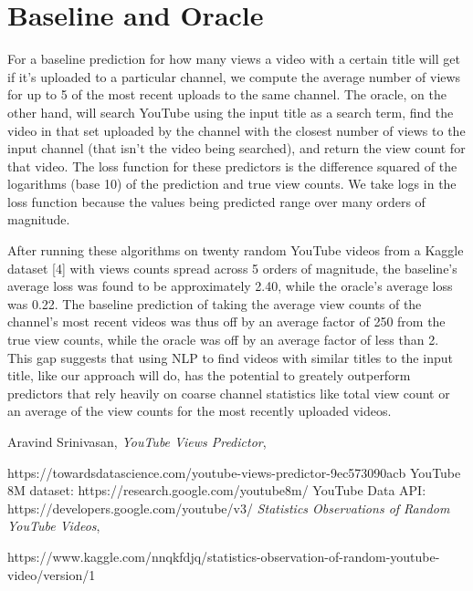 \documentclass[12pt]{article}
\theoremstyle{definition}
\theoremstyle{remark}
\begin{document}
\section{Baseline and Oracle}
For a baseline prediction for how many views a video with a certain title will
get if it's uploaded to a particular channel, we compute the average number of
views for up to 5 of the most recent uploads to the same channel. The oracle, on
the other hand, will search YouTube using the input title as a search term, find
the video in that set uploaded by the channel with the closest number of views
to the input channel (that isn't the video being searched), and return the view
count for that video. The loss function for these predictors is the difference squared
of the logarithms (base 10) of the prediction and true view counts. We take logs
in the loss function because the values being predicted range over many orders
of magnitude.

After running these algorithms on twenty random YouTube videos from a Kaggle
dataset [4] with views counts spread across 5 orders of magnitude, the
baseline's average loss was found to be
approximately 2.40, while the oracle's average loss was 0.22. The baseline
prediction of taking the average view counts of the channel's most recent videos
was thus off by an average factor of 250 from the true view
counts, while the oracle was off by an average factor of less than 2. This gap
suggests that using NLP to find videos with similar titles to the input title,
like our approach will do, has the potential to greately outperform predictors that rely heavily on
coarse channel statistics like total view count or an average of the view counts
for the most recently uploaded videos.


\begin{thebibliography}{99}

 Aravind Srinivasan, \emph{YouTube Views Predictor}, 

    \qquad https://towardsdatascience.com/youtube-views-predictor-9ec573090acb
YouTube 8M dataset: https://research.google.com/youtube8m/
YouTube Data API: https://developers.google.com/youtube/v3/
\emph{Statistics Observations of Random YouTube Videos},

  \qquad https://www.kaggle.com/nnqkfdjq/statistics-observation-of-random-youtube-video/version/1

\end{thebibliography}
\end{document}
